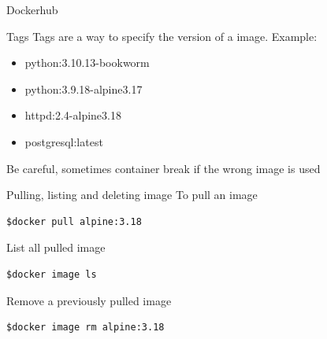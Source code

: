 \documentclass[12pt]{beamer}
\begin{document}
\begin{frame}{Dockerhub}
{    }
\end{frame}


\begin{frame}{Tags}
    Tags are a way to specify the version of a image.
    Example:
    \begin{itemize}
        \item python:3.10.13-bookworm
        \item python:3.9.18-alpine3.17
        \item httpd:2.4-alpine3.18
        \item postgresql:latest
    \end{itemize}
    Be careful, sometimes container break if the wrong image is used
\end{frame}

\begin{frame}[fragile]{Pulling, listing and deleting image}
    To pull an image
    \begin{lstlisting}[language=OwnBash]
$docker pull alpine:3.18
    \end{lstlisting}
    List all pulled image
    \begin{lstlisting}[language=OwnBash]
$docker image ls
    \end{lstlisting}
    Remove a previously pulled image
    \begin{lstlisting}[language=OwnBash]
$docker image rm alpine:3.18
    \end{lstlisting}
\end{frame}
\end{document}
